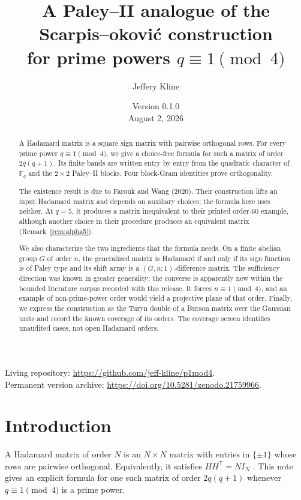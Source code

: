 \documentclass[11pt]{article}
\title{A Paley--II analogue of the Scarpis--\DJ okovi\'c construction\\
       for prime powers \(q\equiv 1\pmod 4\)}
\author{Jeffery Kline}
\date{Version 0.1.0\\August 2, 2026}
\newcommand{\F}{\mathbb F}
\newcommand{\I}{I}
\begin{document}
\maketitle

\begin{center}
\small Living repository: \url{https://github.com/jeff-kline/p1mod4}.\\
Permanent version archive: \url{https://doi.org/10.5281/zenodo.21759966}.
\end{center}

\begin{abstract}
A Hadamard matrix is a square sign matrix with pairwise orthogonal rows.
For every prime power \(q\equiv1\pmod4\), we give a choice-free formula for
such a matrix of order \(2q(q+1)\).  Its finite bands are written entry by
entry from the quadratic character of \(\F_q\) and the \(2\times2\)
Paley--II blocks.  Four block-Gram identities prove orthogonality.

The existence result is due to Farouk and Wang (2020).  Their construction
lifts an input Hadamard matrix and depends on auxiliary choices; the formula
here uses neither.  At \(q=5\), it produces a matrix inequivalent to their
printed order-\(60\) example, although another choice in their procedure
produces an equivalent matrix (Remark~\ref{rem:alpha5}).

We also characterize the two ingredients that the formula needs.  On a finite
abelian group \(G\) of order \(n\), the generalized matrix is Hadamard if and
only if its sign function is of Paley type and its shift array is a
\((G,n;1)\)-difference matrix.  The sufficiency direction was known in greater
generality; the converse is apparently new within the bounded literature
corpus recorded with this release.  It forces
\(n\equiv1\pmod4\), and an example of non-prime-power order would yield a
projective plane of that order.  Finally, we express the construction as the
Turyn double of a Butson matrix over the Gaussian units and record the known
coverage of its orders.  The coverage screen identifies unaudited cases, not
open Hadamard orders.
\end{abstract}

\section{Introduction}

A Hadamard matrix of order \(N\) is an \(N\times N\) matrix with entries
in \(\{\pm1\}\) whose rows are pairwise orthogonal.  Equivalently, it
satisfies \(HH^{\mathsf T}=N\I_N\) \cite{Hadamard1893}.  This note gives an explicit formula for
one such matrix of order \(2q(q+1)\) whenever \(q\equiv1\pmod4\) is a prime
power.
\end{document}
